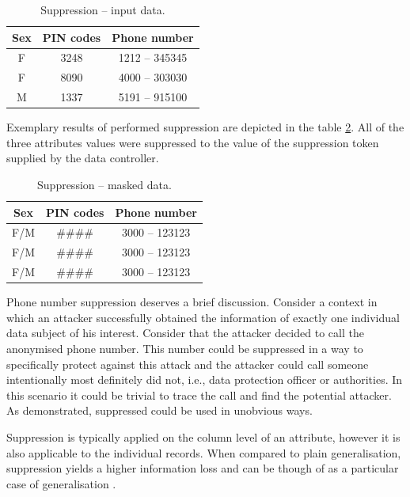 \documentclass[a4paper,twoside,12pt]{book}
\begin{document}
\begin{table}[h]
\centering
\caption{Suppression – input data.}
\label{id:tab:suppression_raw}
\begin{tabular}{ccc}
\toprule
Sex & \multicolumn{1}{l}{PIN codes} & Phone number \\ \midrule
F   & 3248                          & 1212 – 345345  \\
F   & 8090                          & 4000 – 303030  \\
M   & 1337                          & 5191 – 915100 \\
\bottomrule
\end{tabular}
\end{table}

Exemplary results of performed suppression are depicted in the table \ref{id:tab:suppression}. All of the three attributes values were suppressed to the value of the suppression token supplied by the data controller.

\begin{table}[h]
\centering
\caption{Suppression  – masked data.}
\label{id:tab:suppression}
\begin{tabular}{ccc}
\toprule
Sex & PIN codes & Phone number \\ \midrule
F/M & \#\#\#\#  & 3000 – 123123  \\
F/M & \#\#\#\#  & 3000 – 123123  \\
F/M & \#\#\#\#  & 3000 – 123123 \\
\bottomrule
\end{tabular}
\end{table}

Phone number suppression deserves a brief discussion. Consider a context in which an attacker successfully obtained the information of exactly one individual data subject of his interest. Consider that the attacker decided to call the anonymised phone number. This number could be suppressed in a way to specifically protect against this attack and the attacker could call someone intentionally most definitely did not, i.e., data protection officer or authorities. In this scenario it could be trivial to trace the call and find the potential attacker. As demonstrated, suppressed could be used in unobvious ways.

Suppression is typically applied on the column level of an attribute, however it is also applicable to the individual records. When compared to plain generalisation, suppression yields a higher information loss and can be though of as a particular case of generalisation \cite{bib:anonymization_emr}. 
\end{document}

